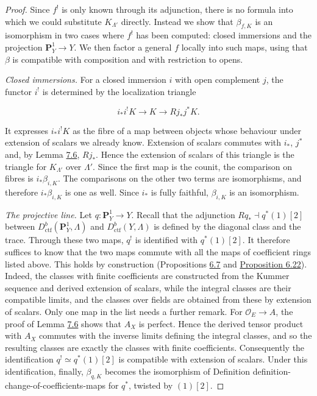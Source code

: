 \documentclass[11pt]{article}
\begin{document}
\begin{proof}[{Proof}]\label{bp622}%
Since \(f^!\) is only known through its adjunction, there is no formula into which we could substitute \(K_{\Lambda'}\) directly. Instead we show that \(\beta_{f,K}\) is an isomorphism in two cases where \(f^!\) has been computed: closed immersions and the projection \(\mathbf P^1_Y\to Y\). We then factor a general \(f\) locally into such maps, using that \(\beta\) is compatible with composition and with restriction to opens.

\emph{Closed immersions.} For a closed immersion \(i\) with open complement \(j\), the functor \(i^!\) is determined by the localization triangle

\[
i_*i^!K\longrightarrow K\longrightarrow Rj_*j^*K.
\]

It expresses \(i_*i^!K\) as the fibre of a map between objects whose behaviour under extension of scalars we already know. Extension of scalars commutes with \(i_*\), \(j^*\) and, by Lemma \hyperref[bp616]{7.6}, \(Rj_*\). Hence the extension of scalars of this triangle is the triangle for \(K_{\Lambda'}\) over \(\Lambda'\). Since the first map is the counit, the comparison on fibres is \(i_*\beta_{i,K}\). The comparisons on the other two terms are isomorphisms, and therefore \(i_*\beta_{i,K}\) is one as well. Since \(i_*\) is fully faithful, \(\beta_{i,K}\) is an isomorphism.

\emph{The projective line.} Let \(q:\mathbf P^1_Y\to Y\). Recall that the adjunction \(Rq_*\dashv q^*(1)[2]\) between \(D^b_{\mathrm{ctf}}(\mathbf P^1_Y,\Lambda)\) and \(D^b_{\mathrm{ctf}}(Y,\Lambda)\) is defined by the diagonal class and the trace. Through these two maps, \(q^!\) is identified with \(q^*(1)[2]\). It therefore suffices to know that the two maps commute with all the maps of coefficient rings listed above. This holds by construction (Propositions \hyperref[bp534]{6.7} and \hyperref[bp581]{Proposition 6.22}). Indeed, the classes with finite coefficients are constructed from the Kummer sequence and derived extension of scalars, while the integral classes are their compatible limits, and the classes over fields are obtained from these by extension of scalars. Only one map in the list needs a further remark. For \(\mathcal O_E\to A\), the proof of Lemma \hyperref[bp616]{7.6} shows that \(A_X\) is perfect. Hence the derived tensor product with \(A_X\) commutes with the inverse limits defining the integral classes, and so the resulting classes are exactly the classes with finite coefficients. Consequently the identification \(q^!\simeq q^*(1)[2]\) is compatible with extension of scalars. Under this identification, finally, \(\beta_{q,K}\) becomes the isomorphism of Definition definition-change-of-coefficients-maps for \(q^*\), twisted by \((1)[2]\).


\end{proof}
\end{document}
